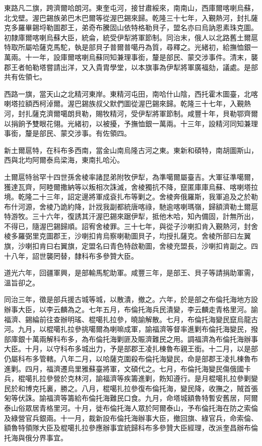 \begin{pinyinscope}
東路凡二旗，跨濟爾哈朗河。東奎屯河，接甘肅綏來，南南山，西庫爾喀喇烏蘇，北戈壁。渥巴錫族弟巴木巴爾等從渥巴錫來歸。乾隆三十七年，入覲熱河，封扎薩克多羅畢錫埒勒圖郡王，弟奇布騰固山依特格勒貝子，盟名亦曰烏訥恩素珠克圖。初隸庫爾喀喇烏蘇大臣，統侖，統受伊犁將軍節制。同治末，俄人以北路舊土爾扈特取所屬哈薩克馬駝，執是部貝子普爾普噶丹為質，尋釋之。光緒初，給撫恤銀一萬兩。十一年，設庫爾喀喇烏蘇同知兼理事銜，釐是部民、蒙交涉事件。清末，襲郡王者帕勒塔嘗請出洋，又入貴胄學堂，以本旗事為伊犁將軍廣福劾，議處。是部共有佐領七。

西路一旗，當天山之北精河東岸。東精河屯田，南哈什山陰，西托霍木圖臺，北喀喇塔拉額西柯淖爾。渥巴錫族叔父默們圖從渥巴錫來歸。乾隆三十七年，入覲熱河，封扎薩克濟爾噶朗貝勒，賜牧精河，受伊犁將軍節制。咸豐十年，貝勒鄂齊爾以捐餉予雙眼花翎。光緒初，以被擾，予撫恤銀一萬兩。十三年，設精河同知兼理事銜，釐是部民、蒙交涉事。有佐領四。

新土爾扈特，在科布多西南，當金山南烏隆古河之東。東新和碩特，南胡圖斯山，西與北均阿爾泰烏梁海，東南扎哈沁。

土爾扈特翁罕十四世孫舍棱率諸昆弟附牧伊犁，為準噶爾屬臺吉。大軍征準噶爾，獲達瓦齊，阿睦爾撒納等以叛相次誅滅，舍棱獨抗不降，竄匿庫庫烏蘇、喀喇塔拉境。乾隆二十三年，詔定邊將軍成袞扎布等剿之。舍棱奔俄羅斯，我軍追及之於勒布什河源，舍棱乃詭約降，計戕我副都統唐喀祿，馳逾喀喇瑪嶺，歸額濟勒土爾扈特游牧。三十六年，復誘其汗渥巴錫來踞伊犁，抵他木哈，知內備固，計無所出，不得已，隨渥巴錫歸順。詔宥舍棱罪。三十七年，與從子沙喇扣肯入覲熱河，封舍棱多羅弼里克圖郡王，沙喇扣肯烏察喇勒圖貝子，均授扎薩克。舍棱所部曰左翼旗，沙喇扣肯曰右翼旗，定盟名曰青色特啟勒圖，舍棱充盟長，沙喇扣肯副之。四十八年，詔世襲罔替，隸科布多參贊大臣。

道光六年，回疆軍興，是部輸馬駝助軍。咸豐三年，是部王、貝子等請捐助軍需，溫旨卻之。

同治三年，徵是部兵援古城等城，以散潰，撤之。六年，於是部之布倫托海地方設辦事大臣，以李云麟為之。七年五月，布倫托海兵民潰變，李云麟走青格里河。諭福濟、錫綸前往查辦明瑤、棍噶扎拉參，曉諭解散。七月，布倫托海變民竄烏龍古河。九月，以棍噶扎拉參挑噶爾為喇嘛成軍，諭福濟等督率進剿布倫托海變民，撥部庫銀十萬兩解科布多，為布倫托海剿匪及賑濟難民之用。調福濟為布倫托海辦事大臣。十月，以守科布多城出力，予是部郡王凌扎棟魯布親王銜。十二月，以是部仍屬科布多管轄。八年二月，以哈薩克圍殺布倫托海變民，命是部郡王凌扎棟魯布進剿。四月，福濟遷烏里雅蘇臺將軍，文碩代之。七月，布倫托海變民傷俄國卡兵，棍噶扎拉參營於克林河，諭福濟等疾籌進剿，飭知遵行。是月棍噶扎拉參剿變民於和博克托裏，勝之。八月，棍噶扎拉參復布倫托海，變民降，收撫之，賊首張匊等伏誅。諭福濟等籌給布倫托海難民口食。九月，命塔城額魯特暫安舊居，阿爾泰山俗眾居青格里河。十月，徙布倫托海人眾於阿爾泰山，予布倫托海在防之索倫及綠營官兵銀兩。十一月，裁新設布倫托海辦事大臣，撤回旗、綠官兵，命索倫、額魯特領隊大臣及棍噶扎拉參應辦事宜統歸科布多參贊大臣經理，改派奎昌辦布倫托海與俄分界事宜。


\end{pinyinscope}
